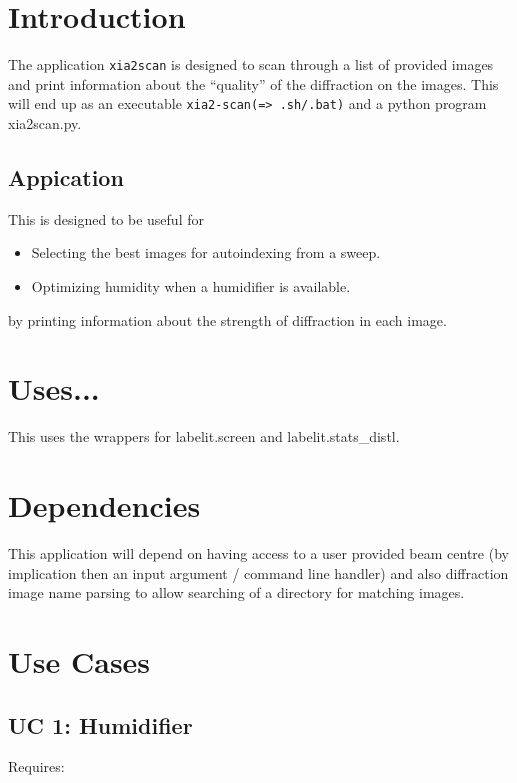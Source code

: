 \documentclass[a4paper, 11pt]{article}
\begin{document}
\section{Introduction}

The application \verb|xia2scan| is designed to scan through a list of 
provided images and print information about the ``quality'' of the 
diffraction on the images. This will end up as an executable
\verb|xia2-scan(=> .sh/.bat)| and a python program xia2scan.py.

\subsection{Appication}

This is designed to be useful for 

\begin{itemize}
\item{Selecting the best images for autoindexing from a sweep.}
\item{Optimizing humidity when a humidifier is available.}
\end{itemize}

\noindent
by printing information about the strength of diffraction in each image.

\section{Uses...}

This uses the wrappers for labelit.screen and labelit.stats\_distl.

\section{Dependencies}

This application will depend on having access to a user provided beam centre
(by implication then an input argument / command line handler) and also 
diffraction image name parsing to allow searching of a directory for
matching images.

\section{Use Cases}

\subsection{UC 1: Humidifier}

Requires:
\end{document}
